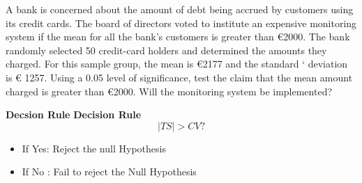 	
 	
 	\item  A bank is concerned about the amount of debt being accrued by customers using its credit
 	cards. The board of directors voted to institute an expensive monitoring system if the mean for all
 	the bank’s customers is greater than €2000. The bank randomly selected 50 credit-card holders and
 	determined the amounts they charged. For this sample group, the mean is €2177 and the standard ‘
 	deviation is € 1257. Using a 0.05 level of significance,  test the claim that the mean amount charged
 	is greater than €2000. Will the monitoring system be implemented? 
 	
 	\noindent \textbf{Decsion Rule}
\textbf{Decision Rule}
\[ |TS| > CV ?  \]
\begin{itemize}
\item If Yes: Reject the null Hypothesis
\item If No : Fail to reject the Null Hypothesis
\end{itemize}
